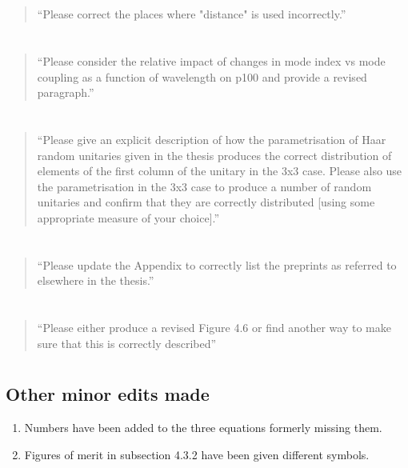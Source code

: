 \documentclass[a4paper,11pt]{article}
\begin{document}
\section{}
\begin{quote}
  ``Please correct the places where "distance" is used incorrectly.''
\end{quote}

\section{}
\begin{quote}
  ``Please consider the relative impact of changes in mode index vs
  mode coupling as a function of wavelength on p100 and provide a
  revised paragraph.''
\end{quote}

\section{}
\begin{quote}
  ``Please give an explicit description of how the parametrisation of
  Haar random unitaries given in the thesis produces the correct
  distribution of elements of the first column of the unitary in the 3x3
  case.  Please also use the parametrisation in the 3x3 case to produce
  a number of random unitaries and confirm that they are correctly
  distributed [using some appropriate measure of your choice].''
\end{quote}

\section{}
\begin{quote}
  ``Please update the Appendix to correctly list the preprints as
  referred to elsewhere in the thesis.''
\end{quote}

\section{}
\begin{quote}
  ``Please either produce a revised Figure 4.6 or find another way to
  make sure that this is correctly described''
\end{quote}

\section{}
\subsection*{Other minor edits made}
\begin{enumerate}
  \item Numbers have been added to the three equations formerly missing them.
  \item Figures of merit in subsection 4.3.2 have been given different symbols.
\end{enumerate}
\end{document}
